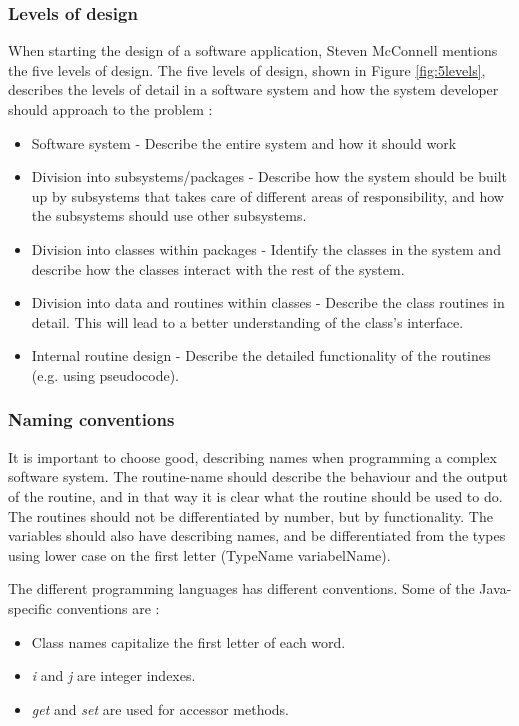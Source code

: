 \subsubsection{Levels of design}
\label{sec:levdes}
When starting the design of a software application, Steven McConnell mentions the five levels of design. The five levels of design, shown in Figure \ref{fig:5levels}, describes the levels of detail in a software system and how the system developer should approach to the problem \cite{stevemcconnell2004}:
\begin{itemize}
	\item Software system - Describe the entire system and how it should work
	\item Division into subsystems/packages - Describe how the system should be built up by subsystems that takes care of different areas of responsibility, and how the subsystems should use other subsystems.
	\item Division into classes within packages - Identify the classes in the system and describe how the classes interact with the rest of the system.
	\item Division into data and routines within classes - Describe the class routines in detail. This will lead to a better understanding of the class's interface.
	\item Internal routine design - Describe the detailed functionality of the routines (e.g. using pseudocode).
\end{itemize}

\subsubsection{Naming conventions}
\label{sec:nameconv}
It is important to choose good, describing names when programming a complex software system. The routine-name should describe the behaviour and the output of the routine, and in that way it is clear what the routine should be used to do. The routines should not be differentiated by number, but by functionality. The variables should also have describing names, and be differentiated from the types using lower case on the first letter (TypeName variabelName).

The different programming languages has different conventions. Some of the Java-specific conventions are \cite{stevemcconnell2004}:
\begin{itemize}
	\item Class names capitalize the first letter of each word.
	\item \textit{i} and \textit{j} are integer indexes.
	\item \textit{get} and \textit{set} are used for accessor methods.
\end{itemize}
